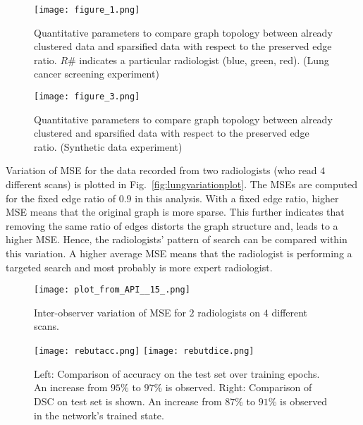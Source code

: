 \documentclass[preprint,12pt]{elsarticle}
\begin{document}
\begin{figure}[h]
\centering
\texttt{[image: figure\_1.png]}
\caption{Quantitative parameters to compare graph topology between already clustered data and sparsified  data with respect to the preserved edge ratio. $R\#$ indicates a particular radiologist (blue, green, red). (Lung cancer screening experiment)\label{fig:lungplot}}
\end{figure}


\begin{figure}[h]
\centering
\texttt{[image: figure\_3.png]}
\caption{Quantitative parameters to compare graph topology between already clustered and sparsified  data with respect to the preserved edge ratio. (Synthetic data experiment)\label{fig:syntheticplot}}
\end{figure}


Variation of MSE for the data recorded from two radiologists (who read $4$ different scans) is plotted in Fig.~\ref{fig:lungvariationplot}. The MSEs are computed for the fixed edge ratio of $0.9$ in this analysis. With a fixed edge ratio, higher MSE means that the original graph is more sparse. This further indicates that removing the same ratio of edges distorts the graph structure and, leads to a higher MSE. Hence, the radiologists' pattern of search can be compared within this variation. A higher average MSE means that the radiologist is performing a targeted search and most probably is more expert radiologist.


\begin{figure}
\texttt{[image: plot\_from\_API\_\_15\_.png]}
\caption{Inter-observer variation of MSE for $2$ radiologists on $4$ different scans. \label{fig:lungvariationplot}}
\texttt{[image: rebutacc.png]}
 \texttt{[image: rebutdice.png]}
  \caption{Left: Comparison of accuracy on the test set over training epochs. An increase from $95\%$ to $97\%$ is observed. Right: Comparison of DSC on test set is shown. An increase from $87\%$ to $91\%$ is observed in the network's trained state.}    \label{fig:jointvssingle}
\end{figure}
\end{document}
